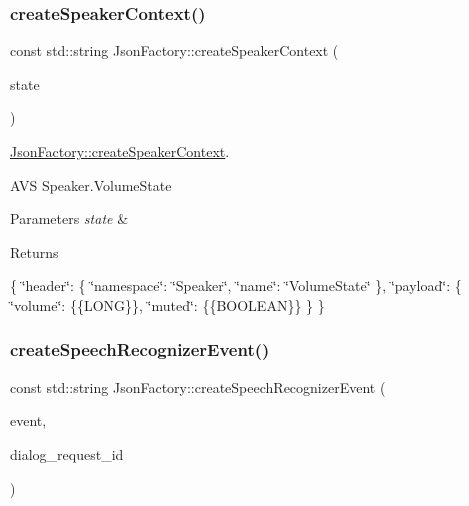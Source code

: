 \subsubsection{\texorpdfstring{create\+Speaker\+Context()}{createSpeakerContext()}}
{\footnotesize\ttfamily const std\+::string Json\+Factory\+::create\+Speaker\+Context (\begin{DoxyParamCaption}\item[{const \hyperlink{structAVSJson_1_1VolumeState}{Volume\+State} $\ast$}]{state }\end{DoxyParamCaption})\hspace{0.3cm}{\ttfamily [protected]}}



\hyperlink{classAVSJson_1_1JsonFactory_af36d05a150eaccfe398f5c128298eab5}{Json\+Factory\+::create\+Speaker\+Context}. 

A\+VS Speaker.\+Volume\+State 
\begin{DoxyParams}{Parameters}
{\em state} & \\
\hline
\end{DoxyParams}
\begin{DoxyReturn}{Returns}

\end{DoxyReturn}
\{ \char`\"{}header\char`\"{}\+: \{ \char`\"{}namespace\char`\"{}\+: \char`\"{}\+Speaker\char`\"{}, \char`\"{}name\char`\"{}\+: \char`\"{}\+Volume\+State\char`\"{} \}, \char`\"{}payload\char`\"{}\+: \{ \char`\"{}volume\char`\"{}\+: \{\{L\+O\+NG\}\}, \char`\"{}muted\char`\"{}\+: \{\{B\+O\+O\+L\+E\+AN\}\} \} \} \mbox{\label{classAVSJson_1_1JsonFactory_ac87cea12e6e85b725c62a35a89816458}} 
\subsubsection{\texorpdfstring{create\+Speech\+Recognizer\+Event()}{createSpeechRecognizerEvent()}}
{\footnotesize\ttfamily const std\+::string Json\+Factory\+::create\+Speech\+Recognizer\+Event (\begin{DoxyParamCaption}\item[{const \hyperlink{structAVSJson_1_1SynchronizeStateEvent}{Synchronize\+State\+Event} $\ast$}]{event,  }\item[{const std\+::string \&}]{dialog\+\_\+request\+\_\+id }\end{DoxyParamCaption})}



